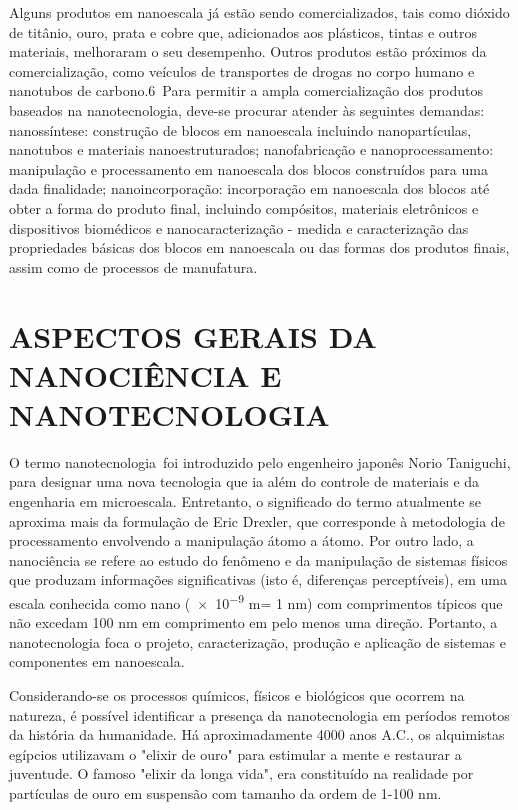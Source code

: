 \documentclass[10pt]{scrartcl}
\begin{document}
Alguns produtos em nanoescala já estão sendo comercializados, tais como dióxido de titânio, ouro, prata e cobre que, adicionados aos plásticos, tintas e outros materiais, melhoraram o seu desempenho. Outros produtos estão próximos da comercialização, como veículos de transportes de drogas no corpo humano e nanotubos de carbono.6 Para permitir a ampla comercialização dos produtos baseados na nanotecnologia, deve-se procurar atender às seguintes demandas: nanossíntese: construção de blocos em nanoescala incluindo nanopartículas, nanotubos e materiais nanoestruturados; nanofabricação e nanoprocessamento: manipulação e processamento em nanoescala dos blocos construídos para uma dada finalidade; nanoincorporação: incorporação em nanoescala dos blocos até obter a forma do produto final, incluindo compósitos, materiais eletrônicos e dispositivos biomédicos e nanocaracterização - medida e caracterização das propriedades básicas dos blocos em nanoescala ou das formas dos produtos finais, assim como de processos de manufatura.

\section{ASPECTOS GERAIS DA NANOCIÊNCIA E NANOTECNOLOGIA}
\label{sec:orge08b38e}

O termo nanotecnologia foi introduzido pelo engenheiro japonês Norio Taniguchi, para designar uma nova tecnologia que ia além do controle de materiais e da engenharia em microescala. Entretanto, o significado do termo atualmente se aproxima mais da formulação de Eric Drexler, que corresponde à metodologia de processamento envolvendo a manipulação átomo a átomo. Por outro lado, a nanociência se refere ao estudo do fenômeno e da manipulação de sistemas físicos que produzam informações significativas (isto é, diferenças perceptíveis), em uma escala conhecida como nano (\num{e-9} m= 1 nm) com comprimentos típicos que não excedam 100 nm em comprimento em pelo menos uma direção. Portanto, a nanotecnologia foca o projeto, caracterização, produção e aplicação de sistemas e componentes em nanoescala.

Considerando-se os processos químicos, físicos e biológicos que ocorrem na natureza, é possível identificar a presença da nanotecnologia em períodos remotos da história da humanidade. Há aproximadamente 4000 anos A.C., os alquimistas egípcios utilizavam o "elixir de ouro" para estimular a mente e restaurar a juventude. O famoso "elixir da longa vida", era constituído na realidade por partículas de ouro em suspensão com tamanho da ordem de 1-100 nm.
\end{document}
